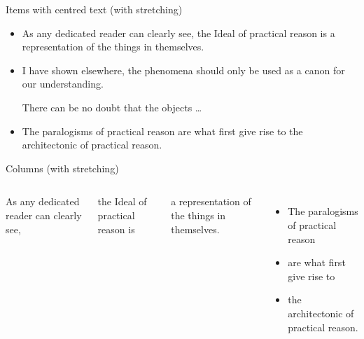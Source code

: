 \documentclass{beamer}
\let\svpar\par
\let\svitemize\itemize
\let\svenditemize\enditemize
\let\svitem\item
\def\newpar{\def\par{\svpar\vfill}}
\def\newitem{\def\item{\vfill\svitem}}
\let\svcenter\center
\let\svendcenter\endcenter
\let\svcolumn\column
\let\svendcolumn\endcolumn
\newlength\columnskip
\def\newcolumn{%
  \renewenvironment{column}[2]%
    {\svcolumn{##1}\setlength{\parskip}{\columnskip}##2}%
    {\svendcolumn\vspace{\columnskip}}}
\newcommand\stretchy{\only<2>{%
  \newpar\def\item{\svitem\newitem}%
  \renewenvironment{itemize}{\svitemize}{\svenditemize\newpar\par}%
  \renewenvironment{center}{\svcenter\newpar}{\svendcenter\newpar}%
  \newcolumn
}}
\begin{document}
\begin{frame}{Items with centred text (with stretching)}
\stretchy

\begin{itemize}
\item As any dedicated reader can clearly see, the Ideal of practical reason is a representation of the things in themselves.
\item I have shown elsewhere, the phenomena should only be used as a canon for our understanding.
\begin{center}
There can be no doubt that the objects \dots
\end{center}
\item The paralogisms of practical reason are what first give rise to the architectonic of practical reason.
\end{itemize}
\end{frame}

\begin{frame}{Columns (with stretching)}
\stretchy

\begin{columns}[c]
\column{1.5in}
As any dedicated reader can clearly see,

the Ideal of practical reason is

a representation of the things in themselves.

\column{1.5in}
\begin{itemize}
\item The paralogisms of practical reason 
\item are what first give rise to
\item the architectonic of practical reason.
\end{itemize}
\end{columns}

\end{frame}
\end{document}
